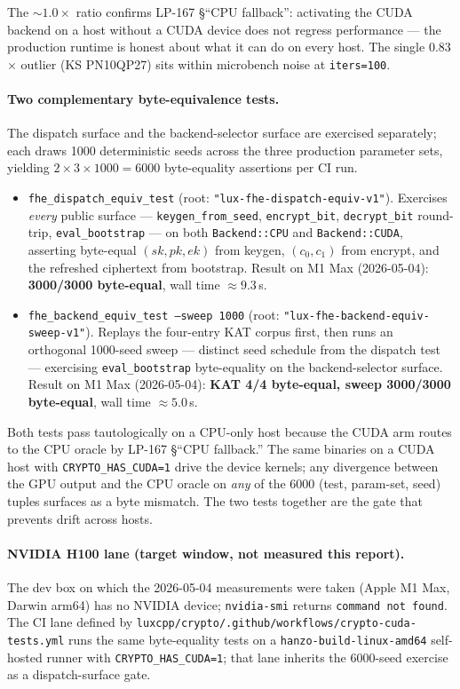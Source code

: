The $\sim 1.0\times$ ratio confirms LP-167 \S``CPU fallback'': activating the
CUDA backend on a host without a CUDA device does not regress
performance --- the production runtime is honest about what it can do
on every host. The single 0.83$\times$ outlier (KS PN10QP27) sits within
microbench noise at \texttt{iters=100}.

\paragraph{Two complementary byte-equivalence tests.}
The dispatch surface and the backend-selector surface are exercised
separately; each draws 1000 deterministic seeds across the three
production parameter sets, yielding $2 \times 3 \times 1000 = 6000$
byte-equality assertions per CI run.

\begin{itemize}
\item \texttt{fhe\_dispatch\_equiv\_test} (root: \texttt{"lux-fhe-dispatch-equiv-v1"}).
  Exercises \emph{every} public surface --- \texttt{keygen\_from\_seed},
  \texttt{encrypt\_bit}, \texttt{decrypt\_bit} round-trip,
  \texttt{eval\_bootstrap} --- on both \texttt{Backend::CPU} and
  \texttt{Backend::CUDA}, asserting byte-equal $(sk, pk, ek)$ from
  keygen, $(c_0, c_1)$ from encrypt, and the refreshed ciphertext from
  bootstrap. Result on M1 Max (2026-05-04): \textbf{3000/3000
  byte-equal}, wall time $\approx 9.3$\,s.
\item \texttt{fhe\_backend\_equiv\_test --sweep 1000} (root:
  \texttt{"lux-fhe-backend-equiv-sweep-v1"}). Replays the four-entry
  KAT corpus first, then runs an orthogonal 1000-seed sweep --- distinct
  seed schedule from the dispatch test --- exercising
  \texttt{eval\_bootstrap} byte-equality on the backend-selector
  surface. Result on M1 Max (2026-05-04): \textbf{KAT 4/4 byte-equal,
  sweep 3000/3000 byte-equal}, wall time $\approx 5.0$\,s.
\end{itemize}

Both tests pass tautologically on a CPU-only host because the CUDA
arm routes to the CPU oracle by LP-167 \S``CPU fallback.'' The same
binaries on a CUDA host with \texttt{CRYPTO\_HAS\_CUDA=1} drive the
device kernels; any divergence between the GPU output and the CPU
oracle on \emph{any} of the 6000 (test, param-set, seed) tuples
surfaces as a byte mismatch. The two tests together are the gate that
prevents drift across hosts.

\paragraph{NVIDIA H100 lane (target window, not measured this report).}
The dev box on which the 2026-05-04 measurements were taken (Apple M1
Max, Darwin arm64) has no NVIDIA device; \texttt{nvidia-smi} returns
\texttt{command not found}. The CI lane defined by
\texttt{luxcpp/crypto/.github/workflows/crypto-cuda-tests.yml} runs the
same byte-equality tests on a \texttt{hanzo-build-linux-amd64}
self-hosted runner with \texttt{CRYPTO\_HAS\_CUDA=1}; that lane
inherits the 6000-seed exercise as a dispatch-surface gate.

